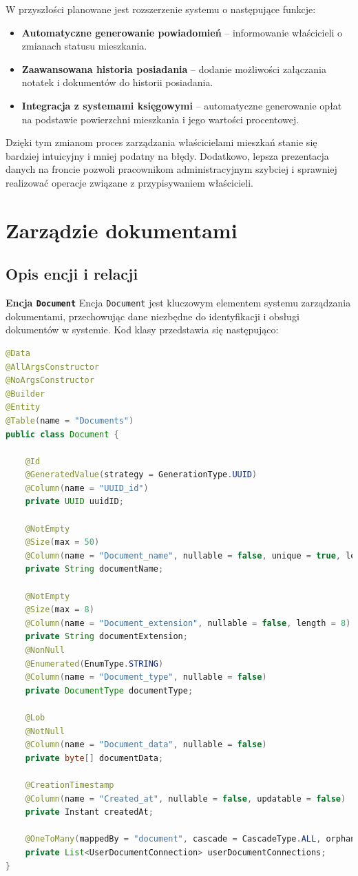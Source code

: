 W przyszłości planowane jest rozszerzenie systemu o następujące funkcje:
\begin{itemize}
    \item \textbf{Automatyczne generowanie powiadomień} -- informowanie właścicieli o zmianach statusu mieszkania.
    \item \textbf{Zaawansowana historia posiadania} -- dodanie możliwości załączania notatek i dokumentów do historii posiadania.
    \item \textbf{Integracja z systemami księgowymi} -- automatyczne generowanie opłat na podstawie powierzchni mieszkania i jego wartości procentowej.
\end{itemize}

Dzięki tym zmianom proces zarządzania właścicielami mieszkań stanie się bardziej intuicyjny i mniej podatny na błędy. Dodatkowo, lepsza prezentacja danych na froncie pozwoli pracownikom administracyjnym szybciej i sprawniej realizować operacje związane z przypisywaniem właścicieli.


\section{Zarządzie dokumentami}

\subsection{Opis encji i relacji}

\textbf{Encja \texttt{Document}}  
Encja \texttt{Document} jest kluczowym elementem systemu zarządzania dokumentami, przechowując dane niezbędne do identyfikacji i obsługi dokumentów w systemie. Kod klasy przedstawia się następująco:

\begin{lstlisting}[language=Java, caption=Encja \texttt{Document}]
@Data
@AllArgsConstructor
@NoArgsConstructor
@Builder
@Entity
@Table(name = "Documents")
public class Document {

    @Id
    @GeneratedValue(strategy = GenerationType.UUID)
    @Column(name = "UUID_id")
    private UUID uuidID; 

    @NotEmpty
    @Size(max = 50)
    @Column(name = "Document_name", nullable = false, unique = true, length = 50)
    private String documentName; 

    @NotEmpty
    @Size(max = 8)
    @Column(name = "Document_extension", nullable = false, length = 8)
    private String documentExtension;
    @NonNull
    @Enumerated(EnumType.STRING)
    @Column(name = "Document_type", nullable = false)
    private DocumentType documentType; 

    @Lob
    @NotNull
    @Column(name = "Document_data", nullable = false)
    private byte[] documentData;

    @CreationTimestamp
    @Column(name = "Created_at", nullable = false, updatable = false)
    private Instant createdAt; 

    @OneToMany(mappedBy = "document", cascade = CascadeType.ALL, orphanRemoval = true)
    private List<UserDocumentConnection> userDocumentConnections; 
}
\end{lstlisting}

